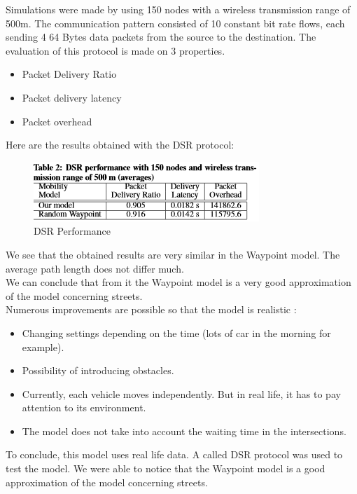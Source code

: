 Simulations were made by using 150 nodes with a wireless transmission range of 500m. The communication  pattern  consisted of 10 constant bit rate flows, each sending 4 64 Bytes data packets from the source to the destination.
The evaluation of this protocol is made on 3 properties.

\begin{itemize}
\item Packet Delivery Ratio
\item Packet delivery latency
\item Packet overhead
\end{itemize}

Here are the results obtained with the DSR protocol:\\

\begin{figure}[h]
\center
\includegraphics{../images/protocoleDSR.png}
\caption{\label{ProtDSR}DSR Performance\cite{VehicularAdHocNetworks9}}
\end{figure}

We see that the obtained results are very similar in the Waypoint model. The average path length does not differ much.\\
We can conclude that from it the Waypoint model is a very good approximation of the model concerning streets.\\
Numerous improvements are possible so that the model is realistic :

\begin{itemize}
\item Changing settings depending on the time (lots of car in the morning for example).
\item Possibility of introducing obstacles.
\item Currently, each vehicle moves independently. But in real life, it has to pay attention to its environment.
\item The model does not take into account the waiting time in the intersections.
\end{itemize}

To conclude, this model uses real life data. A called  DSR protocol was used to test the model. We were able to notice that the Waypoint model is a good approximation of the model concerning streets.


